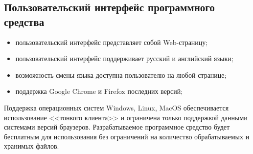 \subsection{Пользовательский интерфейс программного средства}
\begin{itemize}
	\item пользовательский интерфейс представляет собой Web-страницу;
	\item пользовательский интерфейс поддерживает русский и английский языки;
	\item возможность смены языка доступна пользователю на любой странице;
	\item поддержка Google Chrome и Firefox последних версий;
\end{itemize}

Поддержка операционных систем Windows, Linux, MacOS обеспечивается использование <<тонкого клиента>> и ограничена только поддержкой данными системами версий браузеров.
Разрабатываемое программное средство будет бесплатным для использования без ограничений на количество обрабатываемых и хранимых файлов.